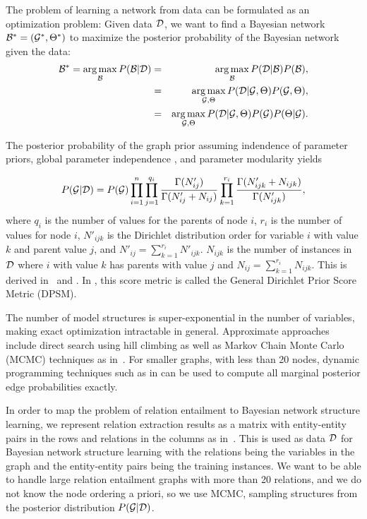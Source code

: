 \documentclass{article}
\DeclareMathOperator*{\argmax}{arg\,max}
\begin{document}
The problem of learning a network from data can be formulated as an
optimization problem: Given data ${\cal D}$, we want to find a Bayesian network ${\cal B}^{*}=({\cal G}^{*},\Theta^{*})$ to maximize
the posterior probability of the Bayesian network given the data:
\begin{eqnarray}
{\cal B}^{*}  =  \argmax_{{\cal B}}P({\cal B}|{\cal D}) & = & \argmax_{{\cal B}} P({\cal D}|{\cal B})P({\cal B}),\\
& = & \argmax_{{\cal G},\Theta} P({\cal D}|{\cal G},\Theta)P({\cal G},\Theta),\\
& = & \argmax_{{\cal G},\Theta} P({\cal D}|{\cal G},\Theta)P({\cal G})P(\Theta|{\cal G}).
\end{eqnarray}

The posterior probability of the graph prior assuming indendence of parameter priors, global parameter independence \cite{Friedman:full}, and parameter modularity \cite{Heckerman1995} yields

\begin{eqnarray}
P({\cal G}|{\cal D}) = P({\cal G})\prod_{i=1}^{n}\prod_{j=1}^{q_i}
\frac{\Gamma(N'_{ij})}{\Gamma(N'_{ij} + N_{ij})}
\prod_{k=1}^{r_i}\frac{\Gamma(N'_{ijk}+N_{ijk})}{\Gamma(N'_{ijk})} ,\label{eqn:dpsm}
\end{eqnarray}
where $q_i$ is the number of values for the parents of node $i$, $r_i$ is the number of values for node $i$, $N'_{ijk}$ is the Dirichlet distribution order for variable $i$
with value $k$ and parent value $j$, and $N'_{ij} =
\sum_{k=1}^{r_i}{N'_{ijk}}$. $N_{ijk}$ is the number of instances in ${\cal D}$ where $i$ with value $k$ has parents with value $j$ and  $N_{ij} =
\sum_{k=1}^{r_i}{N_{ijk}}$. This is derived in~\cite{Cooper1} and \cite{Chang}. In \cite{Chang}, this score metric is called the General Dirichlet Prior Score Metric (DPSM).

The number of model structures is super-exponential in the number of variables, making exact optimization intractable in general. Approximate approaches include direct search using hill climbing as well as Markov Chain Monte Carlo (MCMC) techniques as in~\cite{FK03}. For smaller graphs, with less than 20 nodes, dynamic programming techniques such as in \cite{DBLP:conf/uai/EatonM07} can be used to compute all marginal posterior edge probabilities exactly. 

In order to map the problem of relation entailment to Bayesian network structure learning, we represent relation extraction results as a matrix with entity-entity pairs in the rows and relations in the columns as in~\cite{riedel13relation}. This is used as data $\cal D$ for Bayesian network structure learning with the relations being the variables in the graph and the entity-entity pairs being the training instances. We want to be able to handle large relation entailment graphs with more than 20 relations, and we do not know the node ordering a priori, so we use MCMC, sampling structures from the posterior distribution $P({\cal G}|{\cal D})$.
\end{document}
